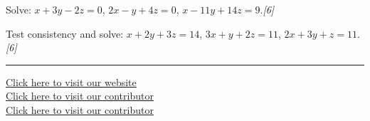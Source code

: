 \documentclass[11pt,a4paper]{article}
\newcommand{\pts}[1]{\hfill   \textit{[#1]}}
\begin{document}
\begin{parts}
  \item Solve: $x+3y-2z=0$, $2x-y+4z=0$, $x-11y+14z=9$.\pts{6}
  \item Test consistency and solve: $x+2y+3z=14$, $3x+y+2z=11$, $2x+3y+z=11$.\pts{6}
\end{parts}

\vfill\rule{\linewidth}{0.4pt}

\begin{center}\small
\href{https://bhu-exam.vercel.app/}{Click here to visit our website}\\[4pt]
\href{https://me-aryan.vercel.app/}{Click here to visit our contributor}\\[4pt]
\href{https://quashan-me.vercel.app/}{Click here to visit our contributor}
\end{center}
\end{document}
